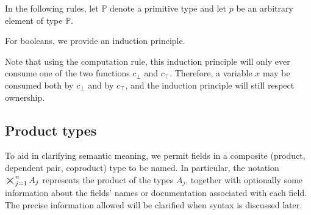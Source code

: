 \documentclass[11pt]{book}
\DeclareMathOperator*{\bigtimes}{\scalerel*{\times}{\textstyle\sum}}
\begin{document}
In the following rules, let \( \mathbb P \) denote a primitive type and let \( p \) be an arbitrary element of type \( \mathbb P \).

For booleans, we provide an induction principle.
Note that using the computation rule, this induction principle will only ever consume one of the two functions \( c_\bot \) and \( c_\top \).
Therefore, a variable \( x \) may be consumed both by \( c_\bot \) and by \( c_\top \), and the induction principle will still respect ownership.

\subsection{Product types}
To aid in clarifying semantic meaning, we permit fields in a composite (product, dependent pair, coproduct) type to be named.
In particular, the notation \( \bigtimes_{j=1}^n A_j \) represents the product of the types \( A_j \), together with optionally some information about the fields' names or documentation associated with each field.
The precise information allowed will be clarified when syntax is discussed later.
\end{document}
